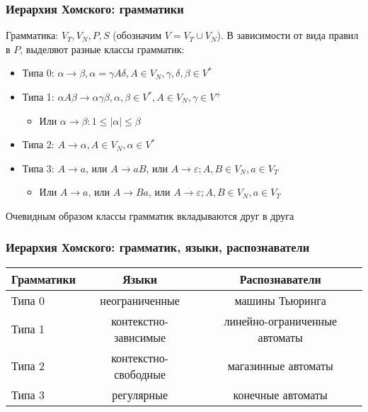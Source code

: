 \documentclass{beamer}
\begin{document}
\begin{frame}[fragile]
  \transwipe[direction=90]
  \frametitle{Иерархия Хомского: грамматики}
  Грамматика: $V_T, V_N, P, S$ (обозначим $V = V_T \cup V_N$). В зависимости от вида правил в $P$, выделяют разные классы грамматик:
  
  \begin{itemize}
    \item Типа 0: $\alpha \rightarrow \beta, \alpha = \gamma A \delta, A \in V_N, \gamma, \delta, \beta \in V^*$
    \item Типа 1: $\alpha A \beta \rightarrow \alpha \gamma \beta, \alpha, \beta \in V^*, A \in V_N, \gamma \in V^+$
    \begin{itemize}
      \item Или $\alpha \rightarrow \beta: 1 \leq |\alpha| \leq \beta $
    \end{itemize}
    \item Типа 2: $A \rightarrow \alpha, A \in V_N, \alpha \in V^*$
    \item Типа 3: $A \rightarrow a$, или $A \rightarrow a B$, или $A \rightarrow \varepsilon; A, B \in V_N, a \in V_T$
    \begin{itemize}
      \item Или $A \rightarrow a$, или $A \rightarrow B a$, или $A \rightarrow \varepsilon; A, B \in V_N, a \in V_T$
    \end{itemize}
  \end{itemize}
  
  Очевидным образом классы грамматик вкладываются друг в друга


\end{frame}


\begin{frame}[fragile]
  \transwipe[direction=90]
  \frametitle{Иерархия Хомского: грамматик, языки, распознаватели}
\begin{center}
\begin{tabular}{ l | c | c }
  Грамматики & Языки & Распознаватели \\ \hline \hline
  Типа 0 & неограниченные & машины Тьюринга \\ \hline
  Типа 1 & контекстно-зависимые & линейно-ограниченные автоматы \\ \hline
  Типа 2 & контекстно-свободные & магазинные автоматы \\ \hline
  Типа 3 & регулярные & конечные автоматы
  
\end{tabular}  
\end{center}

\end{frame}
\end{document}
